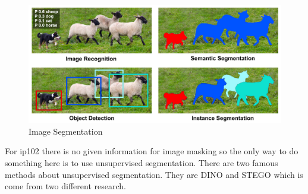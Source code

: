 \begin{figure}
    \centering
    \includegraphics[scale=.25]{figures/segmentation.png}
    \caption{Image Segmentation \cite{mason2001mechanics}}
    \label{fig:my_label}
\end{figure}

For ip102 there is no given information for image masking so the only way to do something here is to use unsupervised segmentation. There are two famous methods about unsupervised segmentation. They are DINO and STEGO which is come from two different research.


